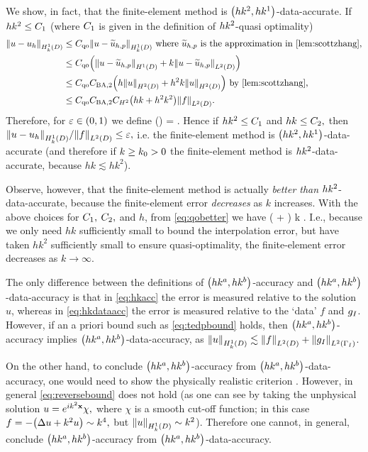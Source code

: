 We show, in fact, that the finite-element method is $\hk{2}{1}$-data-accurate. If $hk^2 \leq C_{1}$ (where $C_{1}$ is given in the definition of $hk^{2}$-quasi optimality)
\begin{align}
  \NHokD{u-\uh} &\leq \Cqo \NHokD{u-\uhptilde}\text{ where } \uhptilde \text{ is the approximation in \cref{lem:scottzhang},}\nonumber\\
  &\leq \Cqo \mleft(\NHoD{u-\uhptilde} + k\NLtD{u-\uhptilde}\mright)\nonumber\\
  &\leq \Cqo \CSZfn{2} \mleft(h\NHtD{u} + h^2k\NHtD{u}\mright) \text{ by \cref{lem:scottzhang},}\nonumber\\
    &\leq \Cqo \CSZfn{2}\CHt\mleft(hk + h^2k^2\mright)\NLtD{f}.\label{eq:qobetter}
\end{align}
Therefore, for $\varepsilon \in (0,1)$ we define
\beqs
\Ct(\eps) =  \min\set{\eps,\sqrt{\eps}}.
\eeqs
\ere
Hence if $hk^2 \leq C_{1}$ and $hk \leq C_{2},$ then $\NHokD{u-\uh}/\NLtD{f} \leq \eps,$ i.e. the finite-element method is $\hk{2}{1}$-data-accurate (and therefore if $k \geq k_{0}>0$ the finite-element method is $hk^{2}$-data-accurate, because $hk\lesssim hk^2$).

Observe, however, that the finite-element method is actually \emph{better than} $hk^{2}$-data-accurate, because the finite-element error \emph{decreases} as $k$ increases. With the above choices for $C_{1},$ $C_{2},$ and $h$, from \cref{eq:qobetter} we have
\beqs
{} \leq \Cqo {} \mleft( + \mright)  \quad\tas k \rightarrow \infty.
\eeqs
I.e., because we only need $hk$ sufficiently small to bound the interpolation error, but have taken $hk^2$ sufficiently small to ensure quasi-optimality, the finite-element error decreases as $k \rightarrow \infty.$


\label{rem:accuracy}
The only difference between the definitions of $\hk{a}{b}$-accuracy and $\hk{a}{b}$-data-accuracy is that in \cref{eq:hkacc} the error is measured relative to the solution $u$, whereas in \cref{eq:hkdataacc} the error is measured relative to the `data' $f$ and $g_{I}$. However, if an a priori bound such as \cref{eq:tedpbound} holds, then $\hk{a}{b}$-accuracy implies $\hk{a}b$-data-accuracy, as $\NHokD{u} \lesssim \NLtD{f} + \NLtGI{\gI}$.

On the other hand, to conclude $\hk{a}{b}$-accuracy from $\hk{a}b$-data-accuracy, one would need to show the physically realistic criterion
\beq\label{eq:reversebound}
 \lesssim {}.
\eeq
However, in general \cref{eq:reversebound} does not hold (as one can see by taking the unphysical solution $u=e^{ik^2 \mathbf{x}}\chi,$ where $\chi$ is a smooth cut-off function; in this case $f = -\mleft(\Lap u + k^2 u\mright) \sim k^4,$ but $\NHokD{u} \sim k^2$). Therefore one cannot, in general, conclude $\hk{a}{b}$-accuracy from $\hk{a}{b}$-data-accuracy.
\ere

